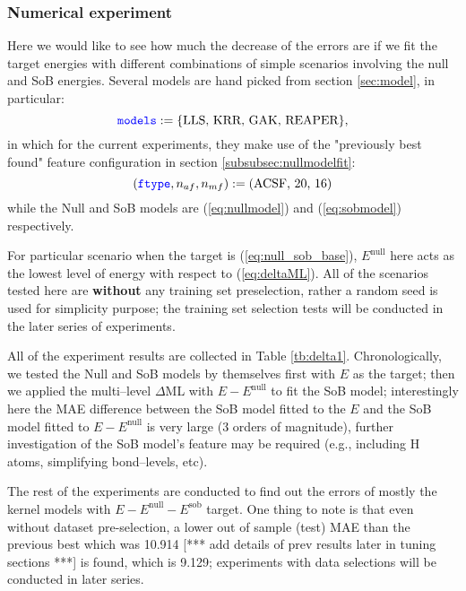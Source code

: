 \documentclass[12pt]{article}
\def\att{                    %
        \marginpar[ \hspace*{\fill} \raisebox{-0.2em}{\rule{2mm}{1.2em}} ]
        {\raisebox{-0.2em}{\rule{2mm}{1.2em}} }
        }
\def\at#1{[*** \att #1 ***]}  %
\begin{document}
\subsubsection{Numerical experiment}
Here we would like to see how much the decrease of the errors are if we fit the target energies with different combinations of simple scenarios involving the null and SoB energies. Several models are hand picked from section \ref{sec:model}, in particular: 
\begin{equation*}
    \codeword{models} := \{\text{LLS, KRR, GAK, REAPER}\},
\end{equation*}
in which for the current experiments, they make use of the "previously best found" feature configuration in section \ref{subsubsec:nullmodelfit}:
\begin{equation*}
    (\codeword{ftype}, n_{af}, n_{mf}) := \text{(ACSF, 20, 16)}    
\end{equation*}
while the Null and SoB models are (\ref{eq:nullmodel}) and (\ref{eq:sobmodel}) respectively.  

For particular scenario when the target is (\ref{eq:null_sob_base}), $E^{\text{null}}$ here acts as the lowest level of energy with respect to (\ref{eq:deltaML}). 
All of the scenarios tested here are \textbf{without} any training set preselection, rather a random seed is used for simplicity purpose; the training set selection tests will be conducted in the later series of experiments.

All of the experiment results are collected in Table \ref{tb:delta1}. Chronologically, we tested the Null and SoB models by themselves first with $E$ as the target; 
then we applied the multi--level $\Delta$ML with $E - E^{\text{null}}$ to fit the SoB model; 
interestingly here the MAE difference between the SoB model fitted to the $E$ and the SoB model fitted to $E - E^{\text{null}}$ is very large (3 orders of magnitude), further investigation of the SoB model's feature may be required (e.g., including H atoms, simplifying bond--levels, etc).

The rest of the experiments are conducted to find out the errors of mostly the kernel models with $E - E^{\text{null}} - E^{\text{sob}}$ target. 
One thing to note is that even without dataset pre-selection, a lower out of sample (test) MAE than the previous best which was 10.914 \at{add details of prev results later in tuning sections} is found, which is 9.129; experiments with data selections will be conducted in later series. 
\end{document}
